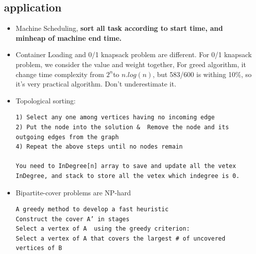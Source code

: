 \documentclass[a4paper,11pt,twoside]{book}
\begin{document}
\subsection{application}
\begin{itemize}
\item  Machine Scheduling, \textbf{sort all task according to start time, and minheap of machine end time. }

\item Container Loading and 0/1 knapsack problem are different. For 0/1 knapsack problem, we consider the value and weight together,  For greed algorithm, it change time complexity from $2^{n}$to $n.log(n)$, but 583/600 is withing 10\%, so it's very practical algorithm.  Don't underestimate it. 

\item Topological sorting: 
\begin{verbatim}
1) Select any one among vertices having no incoming edge
2) Put the node into the solution &  Remove the node and its outgoing edges from the graph
4) Repeat the above steps until no nodes remain

You need to InDegree[n] array to save and update all the vetex InDegree, and stack to store all the vetex which indegree is 0.  
\end{verbatim}


\item Bipartite-cover problems are NP-hard
\begin{verbatim}
A greedy method to develop a fast heuristic
Construct the cover A’ in stages
Select a vertex of A  using the greedy criterion:
Select a vertex of A that covers the largest # of uncovered vertices of B
\end{verbatim}


\end{itemize}
\end{document}
